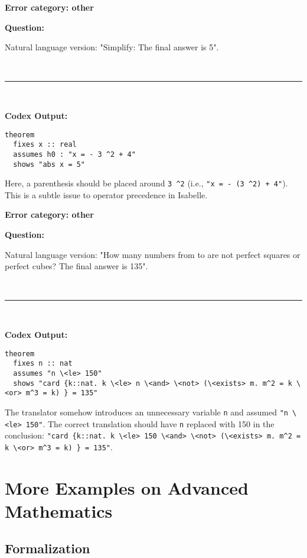 \documentclass{article}
\begin{document}
\begin{boxB}
\textbf{Error category: other}

\textbf{Question:}

Natural language version: "Simplify:  The final answer is 5".

\
\hrule
\

\textbf{Codex Output:}
\begin{lstlisting}
theorem
  fixes x :: real
  assumes h0 : "x = - 3 ^2 + 4"
  shows "abs x = 5" 
\end{lstlisting}
\end{boxB}
Here, a parenthesis should be placed around \lstinline|3 ^2| (i.e., \lstinline|"x = - (3 ^2) + 4"|). This is a subtle issue to operator precedence in Isabelle. 

\begin{boxB}
\textbf{Error category: other}

\textbf{Question:}

Natural language version: "How many numbers from  to  
are not perfect squares or perfect cubes? The final answer is 135".

\
\hrule
\

\textbf{Codex Output:}
\begin{lstlisting}
theorem
  fixes n :: nat
  assumes "n \<le> 150"
  shows "card {k::nat. k \<le> n \<and> \<not> (\<exists> m. m^2 = k \<or> m^3 = k) } = 135"   
\end{lstlisting}
\end{boxB}
The translator somehow introduces an unnecessary variable \lstinline|n| and assumed \lstinline|"n \<le> 150"|. The correct translation should have \lstinline|n| replaced with 150 in the conclusion: \lstinline|"card {k::nat. k \<le> 150 \<and> \<not> (\<exists> m. m^2 = k \<or> m^3 = k) } = 135"|.   


\newpage
\section{More Examples on Advanced Mathematics}
\label{appendix:advanced_formal}

\subsection{Formalization}
\end{document}
